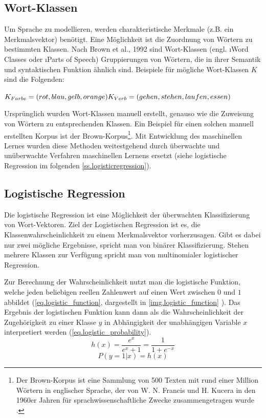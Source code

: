 \subsection{Wort-Klassen}\label{ss.wortklassen}
Um Sprache zu modellieren, werden charakteristische Merkmale (z.B. ein Merkmalsvektor) benötigt. Eine Möglichkeit ist die Zuordnung von Wörtern zu bestimmten Klassen. Nach Brown et al., 1992 \citep{Brown1992} sind Wort-Klassen (engl. \i{Word Classes} oder \i{Parts of Speech}) Gruppierungen von Wörtern, die in ihrer Semantik und syntaktischen Funktion ähnlich sind. Beispiele für mögliche Wort-Klassen $K$ sind die Folgenden:

\tt{$K_{Farbe} = (rot, blau, gelb, orange)\\
K_{Verb} = (gehen, stehen, laufen, essen)$}

Ursprünglich wurden Wort-Klassen manuell erstellt, genauso wie die Zuweisung von Wörtern zu entsprechenden Klassen. Ein Beispiel für einen solchen manuell erstellten Korpus ist der Brown-Korpus\footnote{Der Brown-Korpus ist eine Sammlung von 500 Texten mit rund einer Million Wörtern in englischer Sprache, der von W. N. Francis und H. Kucera in den 1960er Jahren für sprachwissenschaftliche Zwecke zusammengetragen wurde \citep{kucera1967}.}. Mit Entwicklung des maschinellen Lernes wurden diese Methoden weitestgehend durch überwachte und unüberwachte Verfahren maschinellen Lernens ersetzt (siehe logistische Regression im folgenden \autoref{ss.logisticregression}).

\subsection{Logistische Regression}\label{ss.logisticregression}
Die logistische Regression ist eine Möglichkeit der überwachten Klassifizierung von Wort-Vektoren. Ziel der Logistischen Regression ist es, die Klassenwahrscheinlichkeit zu einem Merkmalsvektor vorherzusagen. Gibt es dabei nur zwei mögliche Ergebnisse, spricht man von binärer Klassifizierung. Stehen mehrere Klassen zur Verfügung spricht man von multinomialer logistischer Regression.

Zur Berechnung der Wahrscheinlichkeit nutzt man die logistische Funktion, welche jeden beliebigen reellen Zahlenwert auf einen Wert zwischen $0$ und $1$ abbildet (\autoref{eq.logistic_function}, dargestellt in \autoref{img.logistic_function} ). Das Ergebnis der logistischen Funktion kann dann als die Wahrscheinlichkeit der Zugehörigkeit zu einer Klasse $y$ in Abhängigkeit der unabhängigen Variable $x$ interpretiert werden (\autoref{eq.logistic_probability}).
\begin{equation}
    h(x) = \frac{e^x}{e^x+1} = \frac{1}{1+e^{-x}}  \label{eq.logistic_function}
\end{equation}
\begin{equation}
    P(y=1|x) = h(x)  \label{eq.logistic_probability}
\end{equation}

